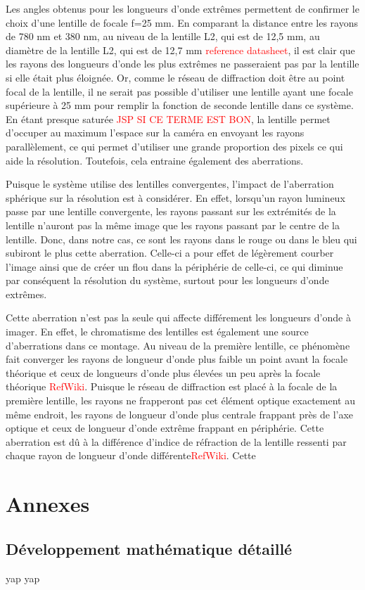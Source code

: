 \documentclass[conference]{IEEEtran}
\begin{document}
Les angles obtenus pour les longueurs d'onde extrêmes permettent de confirmer le choix d'une lentille de focale f=25 mm. En 
comparant la distance entre les rayons de 780 nm et 380 nm, au niveau de la lentille L2, qui est de 12,5 mm, au diamètre de
la lentille L2, qui est de 12,7 mm \textcolor{red}{reference datasheet}, il est clair que les rayons des longueurs d'onde 
les plus extrêmes ne passeraient pas par la lentille si elle était plus éloignée. Or, comme le réseau de diffraction doit être
au point focal de la lentille, il ne serait pas possible d'utiliser une lentille ayant une focale supérieure à 25 mm pour 
remplir la fonction de seconde lentille dans ce système. En étant presque saturée \textcolor{red}{JSP SI CE TERME EST BON}, 
la lentille permet d'occuper au maximum l'espace sur la caméra en envoyant les rayons parallèlement, ce qui permet d'utiliser
une grande proportion des pixels ce qui aide la résolution. Toutefois, cela entraine également des aberrations.

Puisque le système utilise des lentilles convergentes, l'impact de l'aberration sphérique \cite{edmund_optics_aberrations} sur la résolution est à considérer.
En effet, lorsqu'un rayon lumineux passe par une lentille convergente, les rayons passant sur les extrémités de la lentille
n'auront pas la même image que les rayons passant par le centre de la lentille. Donc, dans notre cas, ce sont les
rayons dans le rouge ou dans le bleu qui subiront le plus cette aberration. Celle-ci a pour effet de légèrement courber l'image
ainsi que de créer un flou dans la périphérie de celle-ci, ce qui diminue par conséquent la résolution du système, surtout pour les longueurs d'onde
extrêmes. 

Cette aberration n'est pas la seule qui affecte différement les longueurs d'onde à imager. En effet, le chromatisme des lentilles
est également une source d'aberrations dans ce montage. Au niveau de la première lentille, ce phénomène fait converger les rayons 
de longueur d'onde plus faible un point avant la focale théorique et ceux de longueurs d'onde plus élevées un peu après la focale
théorique \textcolor{red}{RefWiki}. Puisque le réseau de diffraction est placé à la focale de la première lentille, les rayons ne
frapperont pas cet élément optique exactement au même endroit, les rayons de longueur d'onde plus centrale frappant près de l'axe
optique et ceux de longueur d'onde extrême frappant en périphérie. Cette aberration est dû à la différence d'indice de réfraction 
de la lentille ressenti par chaque rayon de longueur d'onde différente\textcolor{red}{RefWiki}. Cette 


\clearpage
\printbibliography

\section{Annexes}

\subsection{Développement mathématique détaillé}
yap yap


\clearpage
\end{document}

